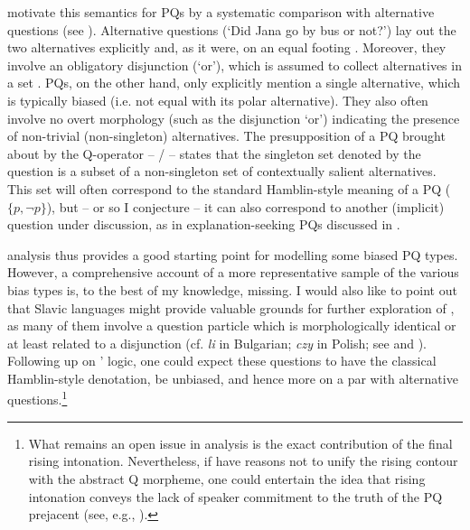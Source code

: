 \documentclass[output=paper,colorlinks,citecolor=brown]{langscibook}
\begin{document}
\noindent\citet{Biezma.Rawlins2012} motivate this semantics for PQs by a systematic comparison with alternative questions (see ). Alternative questions (`Did Jana go by bus or not?') lay out the two alternatives explicitly and, as it were, on an equal footing \citep{Bolinger1978,vanRooy.Safarova2003}. Moreover, they involve an obligatory disjunction (`or'), which is assumed to collect alternatives in a set \citep{Alonso-Ovalle2006}. PQs, on the other hand, only explicitly mention a single alternative, which is typically biased (i.e. not equal with its polar alternative). They also often involve no overt morphology (such as the disjunction `or') indicating the presence of non-trivial (non-singleton) alternatives. The presupposition of a PQ brought about by the Q-operator -- / -- states that the singleton set denoted by the question is a subset of a non-singleton set of contextually salient alternatives. This set will often correspond to the standard Hamblin-style meaning of a PQ ($\{p,\neg p\}$), but -- or so I conjecture -- it can also correspond to another (implicit) question under discussion, as in explanation-seeking PQs discussed in .

 analysis thus provides a good starting point for modelling some biased PQ types. However, a comprehensive account of a more representative sample of the various bias types is, to the best of my knowledge, missing. I would also like to point out that Slavic languages might provide valuable grounds for further exploration of \citet{Biezma.Rawlins2012}, as many of them involve a question particle which is morphologically identical or at least related to a disjunction (cf. \textit{li} in Bulgarian; \textit{czy} in Polish; see \citealt{Logvinova2022} and ). Following up on \citeauthor{Biezma.Rawlins2012}' logic, one could expect these questions to have the classical Hamblin-style denotation, be unbiased, and hence more on a par with alternative questions.\footnote{What remains an open issue in  analysis is the exact contribution of the final rising intonation. Nevertheless, if \citeauthor{Biezma.Rawlins2012} have reasons not to unify the rising contour with the abstract Q morpheme, one could entertain the idea that rising intonation conveys the lack of speaker commitment to the truth of the PQ prejacent (see, e.g., \citealt{Gunlogson2003,Gunlogson2008,Malamud.Stephenson2015,Rudin2022}).}
\end{document}
